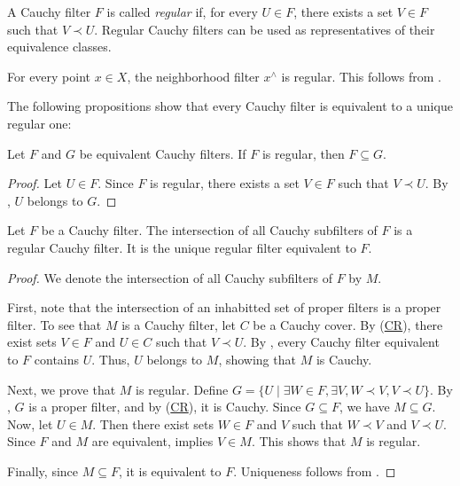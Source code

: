 \documentclass[reqno]{amsart}
\newcommand{\axref}[1]{(\hyperref[ax:#1]{#1})}
\theoremstyle{definition}
\theoremstyle{remark}
\numberwithin{figure}{section}
\newcommand{\rb}{\prec}
\begin{document}
A Cauchy filter $F$ is called \emph{regular} if, for every $U \in F$, there exists a set $V \in F$ such that $V \rb U$.
Regular Cauchy filters can be used as representatives of their equivalence classes.

\begin{example}
For every point $x \in X$, the neighborhood filter $x^\wedge$ is regular.
This follows from .
\end{example}

The following propositions show that every Cauchy filter is equivalent to a unique regular one:

\begin{prop}
Let $F$ and $G$ be equivalent Cauchy filters.
If $F$ is regular, then $F \subseteq G$.
\end{prop}
\begin{proof}
Let $U \in F$.  
Since $F$ is regular, there exists a set $V \in F$ such that $V \rb U$.
By , $U$ belongs to $G$.
\end{proof}

\begin{prop}
Let $F$ be a Cauchy filter.
The intersection of all Cauchy subfilters of $F$ is a regular Cauchy filter.
It is the unique regular filter equivalent to $F$.  
\end{prop}
\begin{proof}
We denote the intersection of all Cauchy subfilters of $F$ by $M$.

First, note that the intersection of an inhabitted set of proper filters is a proper filter.  
To see that $M$ is a Cauchy filter, let $C$ be a Cauchy cover.  
By \axref{CR}, there exist sets $V \in F$ and $U \in C$ such that $V \rb U$.
By , every Cauchy filter equivalent to $F$ contains $U$.
Thus, $U$ belongs to $M$, showing that $M$ is Cauchy.  

Next, we prove that $M$ is regular.  
Define $G = \{ U \mid \exists W \in F, \exists V, W \rb V, V \rb U \}$.
By , $G$ is a proper filter, and by \axref{CR}, it is Cauchy.
Since $G \subseteq F$, we have $M \subseteq G$.
Now, let $U \in M$.  
Then there exist sets $W \in F$ and $V$ such that $W \rb V$ and $V \rb U$.  
Since $F$ and $M$ are equivalent,  implies $V \in M$.
This shows that $M$ is regular.  

Finally, since $M \subseteq F$, it is equivalent to $F$.  
Uniqueness follows from .  
\end{proof}
\end{document}
